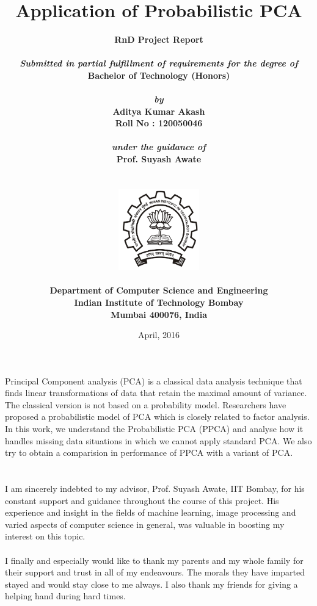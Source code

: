 \documentclass[12pt]{report}
\title{\textbf{Application of Probabilistic PCA}}
\author{
		\bf{RnD Project Report}\\
        \\
        \emph{Submitted in partial fulfillment of requirements for the degree of}\\
        \bf{Bachelor of Technology (Honors)}\\
        \\
        \emph{by}\\
		\bf{Aditya Kumar Akash}\\
        \bf{Roll No : 120050046}\\
        \\
        \emph{under the guidance of}\\
		\bf{Prof. Suyash Awate}\\
        \\\\
        \includegraphics[height=3.5cm]{./iitb_logo.jpg}\\
        \\
		\bf{Department of Computer Science and Engineering}\\
        \bf{Indian Institute of Technology Bombay}\\
        \bf{Mumbai 400076, India}\\
}
\date{April, 2016}
\makeatletter
\newcommand\frontmatter{%
  \cleardoublepage
  \pagenumbering{roman}}
\newcommand\mainmatter{%
  \cleardoublepage
  \pagenumbering{arabic}}
\makeatother
\begin{document}
\frontmatter
\maketitle
\pagebreak
\tableofcontents
\pagebreak

\chapter*{}
Principal Component analysis (PCA) is a classical data analysis technique that finds linear transformations of data that retain the maximal amount of variance. The classical version is not based on a probability model. Researchers have proposed a probabilistic model of PCA which is closely related to factor analysis. In this work, we understand the Probabilistic PCA (PPCA) and analyse how it handles missing data situations in which we cannot apply standard PCA. We also try to obtain a comparision in performance of PPCA with a variant of PCA.

\pagebreak

\chapter*{}
I am sincerely indebted to my advisor, Prof. Suyash Awate, IIT Bombay, for his constant support and guidance throughout the course of this project. His experience and insight in the fields of machine learning, image processing and varied aspects of computer science in general, was valuable in boosting my interest on this topic. \\\\
I finally and especially would like to thank my parents and my whole family for their support and trust in all of my endeavours. The morals they have imparted stayed and would stay close to me always. I also thank my friends for giving a helping hand during hard times.
\pagebreak


\mainmatter






	
\newpage
\end{document}
